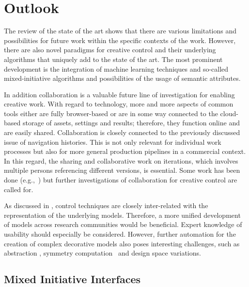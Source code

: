 
\section{Outlook}
\label{sec:outlook}

The review of the state of the art shows that there are various limitations and possibilities for future work within the specific contexts of the work. However, there are also novel paradigms for creative control and their underlying algorithms that uniquely add to the state of the art. The most prominent development is the integration of machine learning techniques and so-called mixed-initiative algorithms and possibilities of the usage of semantic attributes.

In addition collaboration is a valuable future line of investigation for enabling creative work. With regard to technology, more and more aspects of common tools either are fully browser-based or are in some way connected to the cloud-based storage of assets, settings and results; therefore, they function online and are easily shared. Collaboration is closely connected to the previously discussed issue of navigation histories. This is not only relevant for individual work processes but also for more general production pipelines in a commercial context. In this regard, the sharing and collaborative work on iterations, which involves multiple persons referencing different versions, is essential. Some work has been done (e.g.,~\cite{talton_2009_emw, salvati_2015_mcm,oleary_2018_csi}) but further investigations of collaboration for creative control are called for. 

As discussed in , control techniques are closely inter-related with the representation of the underlying models. Therefore, a more unified development of models across research communities would be beneficial. Expert knowledge of usability should especially be considered. However, further automation for the creation of complex decorative models also poses interesting challenges, such as abstraction \cite{nan_2011_cgr}, symmetry computation~\cite{cullen_2011_sh} and design space variations.


\subsection{Mixed Initiative Interfaces}
\label{subsec:analysis_outlook_mixed_initiative_interfaces}

